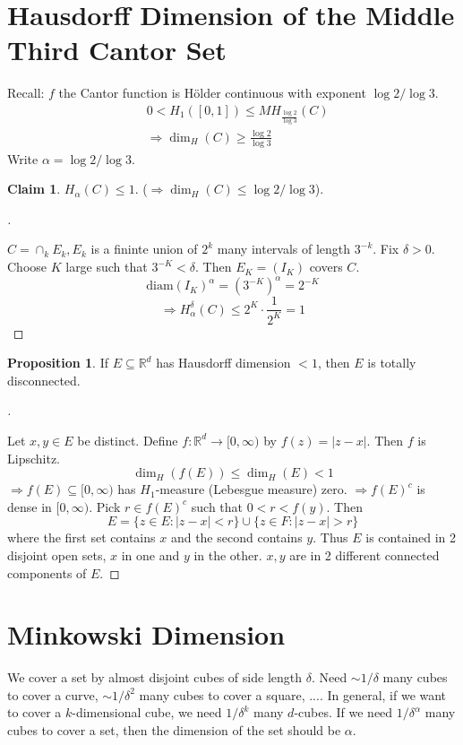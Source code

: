 \documentclass{article}
\theoremstyle{definition}
\newtheorem{prop}{Proposition}
\newtheorem*{clm}{Claim}
\newenvironment{proofs}[1][\proofname]{%
  \begin{proof}[#1]$ $\par\nobreak\ignorespaces
}{%
  \end{proof}
}
\newcommand{\RR}{\mathbb R}
\newcommand{\Ra}{\Rightarrow}
\begin{document}
\section{Hausdorff Dimension of the Middle Third Cantor Set}

Recall: $f$ the Cantor function is H\"older continuous with exponent $\log 2/\log 3$.
\begin{align*}
	&0 < H_1([0, 1]) \leq MH_{\frac{\log 2}{\log 3}} (C)\\
	&\Ra \dim_H(C) \geq \frac{\log 2}{\log 3}
\end{align*}
Write $\alpha = \log 2/\log 3$.

\begin{clm}
	$H_\alpha(C) \leq 1$. ($\Ra \dim_H(C) \leq \log 2/\log 3$).	
\end{clm}

\begin{proofs}
	$C = \cap_k E_k, E_k$ is a fininte union of $2^k$ many intervals of length $3^{-k}$.
	Fix $\delta > 0$.
	Choose $K$ large such that $3^{-K} < \delta$.
	Then $E_K = (I_K)$ covers $C$.
	\[
		\text{diam} (I_K)^\alpha = (3^{-K})^\alpha = 2^{-K}
	\]
	\[
		\Ra H_\alpha^\delta(C) \leq 2^K \cdot \frac{1}{2^K} = 1
	\]
\end{proofs}
\begin{prop}
	If $E \subseteq \RR^d$ has Hausdorff dimension $< 1$, then $E$ is totally disconnected.
\end{prop}

\begin{proofs}
	Let $x, y\in E$ be distinct.
	Define $f: \RR^d \to [0, \infty)$ by $f(z) = |z - x|$.
	Then $f$ is Lipschitz.
	\[
		\dim_H(f(E)) \leq \dim_H(E) < 1
	\]
	$\Ra f(E) \subseteq [0, \infty)$ has $H_1$-measure (Lebesgue measure) zero.
	$\Ra f(E)^c$ is dense in $[0, \infty)$.
	Pick $r \in f(E)^c$ such that $0 < r < f(y)$.
	Then 
	\[
		E = \{z \in E: |z - x| < r\} \cup \{z \in F: |z - x| > r\}
	\]
	where the first set contains $x$ and the second contains $y$.
	Thus $E$ is contained in 2 disjoint open sets, $x$ in one and $y$ in the other.
	$x, y$ are in 2 different connected components of $E$.
\end{proofs}

\section{Minkowski Dimension}

We cover a set by almost disjoint cubes of side length $\delta$.
Need $\sim 1/\delta$ many cubes to cover a curve, $\sim 1/\delta^2$ many cubes to cover a square, ....
In general, if we want to cover a $k$-dimensional cube, we need $1/\delta^k$ many $d$-cubes.
If we need $1/\delta^\alpha$ many cubes to cover a set, then the dimension of the set should be $\alpha$.
\end{document}
